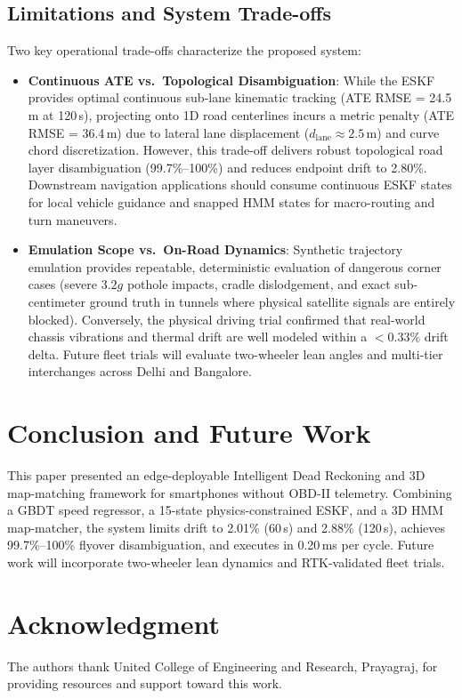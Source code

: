\documentclass[conference]{IEEEtran}
\begin{document}
\subsection{Limitations and System Trade-offs}
Two key operational trade-offs characterize the proposed system:
\begin{itemize}
\item \textbf{Continuous ATE vs.\ Topological Disambiguation}: While the ESKF provides optimal continuous sub-lane kinematic tracking (ATE RMSE = 24.5\,m at 120\,s), projecting onto 1D road centerlines incurs a metric penalty (ATE RMSE = 36.4\,m) due to lateral lane displacement ($d_{\text{lane}} \approx 2.5$\,m) and curve chord discretization. However, this trade-off delivers robust topological road layer disambiguation (99.7\%--100\%) and reduces endpoint drift to 2.80\%. Downstream navigation applications should consume continuous ESKF states for local vehicle guidance and snapped HMM states for macro-routing and turn maneuvers.
\item \textbf{Emulation Scope vs.\ On-Road Dynamics}: Synthetic trajectory emulation provides repeatable, deterministic evaluation of dangerous corner cases (severe $3.2g$ pothole impacts, cradle dislodgement, and exact sub-centimeter ground truth in tunnels where physical satellite signals are entirely blocked). Conversely, the physical driving trial confirmed that real-world chassis vibrations and thermal drift are well modeled within a $<0.33\%$ drift delta. Future fleet trials will evaluate two-wheeler lean angles and multi-tier interchanges across Delhi and Bangalore.
\end{itemize}

\section{Conclusion and Future Work}
This paper presented an edge-deployable Intelligent Dead Reckoning and 3D map-matching framework for smartphones without OBD-II telemetry. Combining a GBDT speed regressor, a 15-state physics-constrained ESKF, and a 3D HMM map-matcher, the system limits drift to 2.01\% (60\,s) and 2.88\% (120\,s), achieves 99.7\%--100\% flyover disambiguation, and executes in 0.20\,ms per cycle. Future work will incorporate two-wheeler lean dynamics and RTK-validated fleet trials.

\section*{Acknowledgment}
The authors thank United College of Engineering and Research, Prayagraj, for providing resources and support toward this work.
\end{document}
